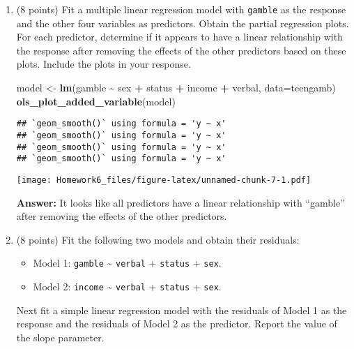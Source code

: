 \documentclass[
]{article}
\newenvironment{Shaded}{\begin{snugshade}}{\end{snugshade}}
\newcommand{\AttributeTok}[1]{\textcolor[rgb]{0.13,0.29,0.53}{#1}}
\newcommand{\FunctionTok}[1]{\textcolor[rgb]{0.13,0.29,0.53}{\textbf{#1}}}
\newcommand{\NormalTok}[1]{#1}
\newcommand{\OtherTok}[1]{\textcolor[rgb]{0.56,0.35,0.01}{#1}}
\newcommand{\SpecialCharTok}[1]{\textcolor[rgb]{0.81,0.36,0.00}{\textbf{#1}}}
\providecommand{\tightlist}{%
  \setlength{\itemsep}{0pt}\setlength{\parskip}{0pt}}
\begin{document}
\begin{enumerate}
\def\labelenumi{\arabic{enumi}.}
\item
  (8 points) Fit a multiple linear regression model with \texttt{gamble}
  as the response and the other four variables as predictors. Obtain the
  partial regression plots. For each predictor, determine if it appears
  to have a linear relationship with the response after removing the
  effects of the other predictors based on these plots. Include the
  plots in your response.

\begin{Shaded}
\begin{Highlighting}[]
\NormalTok{model }\OtherTok{\textless{}{-}} \FunctionTok{lm}\NormalTok{(gamble }\SpecialCharTok{\textasciitilde{}}\NormalTok{ sex }\SpecialCharTok{+}\NormalTok{ status }\SpecialCharTok{+}\NormalTok{ income }\SpecialCharTok{+}\NormalTok{ verbal, }\AttributeTok{data=}\NormalTok{teengamb)}
\FunctionTok{ols\_plot\_added\_variable}\NormalTok{(model)}
\end{Highlighting}
\end{Shaded}

\begin{verbatim}
## `geom_smooth()` using formula = 'y ~ x'
## `geom_smooth()` using formula = 'y ~ x'
## `geom_smooth()` using formula = 'y ~ x'
## `geom_smooth()` using formula = 'y ~ x'
\end{verbatim}

  \texttt{[image: Homework6\_files/figure-latex/unnamed-chunk-7-1.pdf]}

  \textbf{Answer:} It looks like all predictors have a linear
  relationship with ``gamble'' after removing the effects of the other
  predictors.
\item
  (8 points) Fit the following two models and obtain their residuals:

  \begin{itemize}
  \tightlist
  \item
    Model 1: \texttt{gamble} \textasciitilde{} \texttt{verbal} +
    \texttt{status} + \texttt{sex}.
  \item
    Model 2: \texttt{income} \textasciitilde{} \texttt{verbal} +
    \texttt{status} + \texttt{sex}.
  \end{itemize}

  Next fit a simple linear regression model with the residuals of Model
  1 as the response and the residuals of Model 2 as the predictor.
  Report the value of the slope parameter.


\end{enumerate}
\end{document}
